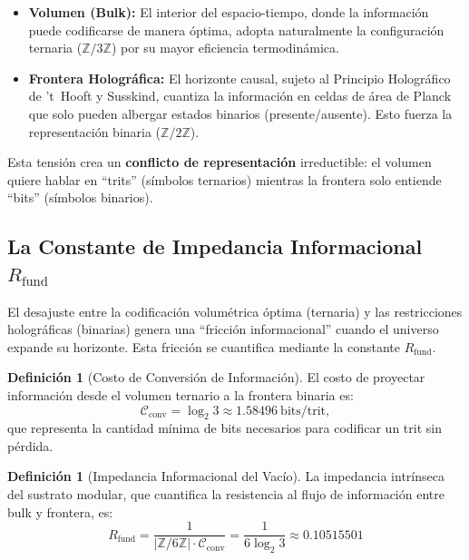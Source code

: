 \documentclass[11pt, a4paper]{article}
\theoremstyle{plain}
\theoremstyle{definition}
\newtheorem{definicion}[teorema]{Definición}
\newcommand{\Zmod}{\mathbb{Z}/6\mathbb{Z}}
\newcommand{\Rfactor}{R_{\text{fund}}}
\begin{document}
\begin{itemize}
    \item \textbf{Volumen (Bulk):} El interior del espacio-tiempo, donde la información puede codificarse de manera óptima, adopta naturalmente la configuración ternaria ($\mathbb{Z}/3\mathbb{Z}$) por su mayor eficiencia termodinámica.
    
    \item \textbf{Frontera Holográfica:} El horizonte causal, sujeto al Principio Holográfico de 't~Hooft y Susskind, cuantiza la información en celdas de área de Planck que solo pueden albergar estados binarios (presente/ausente). Esto fuerza la representación binaria ($\mathbb{Z}/2\mathbb{Z}$).
\end{itemize}

Esta tensión crea un \textbf{conflicto de representación} irreductible: el volumen quiere hablar en ``trits'' (símbolos ternarios) mientras la frontera solo entiende ``bits'' (símbolos binarios).

\subsection{La Constante de Impedancia Informacional \texorpdfstring{$\Rfactor$}{Rfund}}

El desajuste entre la codificación volumétrica óptima (ternaria) y las restricciones holográficas (binarias) genera una ``fricción informacional'' cuando el universo expande su horizonte. Esta fricción se cuantifica mediante la constante $\Rfactor$.

\begin{definicion}[Costo de Conversión de Información]
El costo de proyectar información desde el volumen ternario a la frontera binaria es:
\begin{equation}
\mathcal{C}_{\text{conv}} = \log_2 3 \approx 1.58496 \ \text{bits/trit},
\end{equation}
que representa la cantidad mínima de bits necesarios para codificar un trit sin pérdida.
\end{definicion}

\begin{definicion}[Impedancia Informacional del Vacío]
La impedancia intrínseca del sustrato modular, que cuantifica la resistencia al flujo de información entre bulk y frontera, es:
\begin{equation}
\boxed{\Rfactor = \frac{1}{|\Zmod| \cdot \mathcal{C}_{\text{conv}}} = \frac{1}{6 \log_2 3} \approx 0.10515501}
\label{eq:rfund_def}
\end{equation}
\end{definicion}
\end{document}
